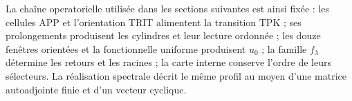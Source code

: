 La chaîne operatorielle utilisée dans les sections suivantes est ainsi fixée : les cellules APP et l’orientation TRIT alimentent la transition TPK ; ses prolongements produisent les cylindres et leur lecture ordonnée ; les douze fenêtres orientées et la fonctionnelle uniforme produisent \(u_0\) ; la famille \(f_\lambda\) détermine les retours et les racines ; la carte interne conserve l’ordre de leurs sélecteurs. La réalisation spectrale décrit le même profil au moyen d’une matrice autoadjointe finie et d’un vecteur cyclique.
